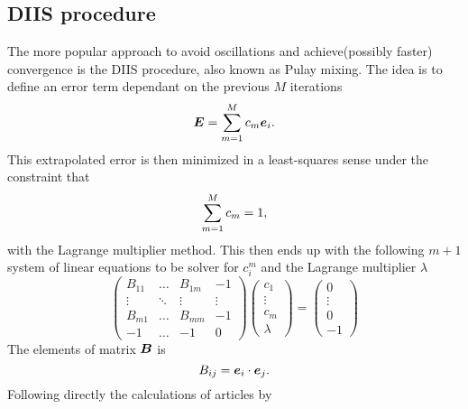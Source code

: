 \subsection{DIIS procedure}
    The more popular approach to avoid oscillations and achieve(possibly
    faster) convergence is the DIIS procedure, also known as Pulay
    mixing\cite{PULAY,PULAY2}. The idea is to define an 
    error term dependant on the previous $M$ iterations
        \begin{equation}
            \blds{E} = \suml{m=1}{M} c_m\blds{e}_i.
        \end{equation}
    This extrapolated error is then minimized in a least-squares sense under
    the constraint that
        \begin{equation}
            \suml{m=1}{M} c_m = 1,
        \end{equation}
    with the Lagrange multiplier method. This then ends up with the following
    $m+1$ system of linear equations to be solver for ${c}^{m}_i$ and the
    Lagrange multiplier $\lambda$
        \begin{equation}
            \begin{pmatrix}
                B_{11} & \dots & B_{1m} & -1 \\
                \vdots & \ddots & \vdots & \vdots \\
                B_{m1} & \dots & B_{mm} & -1 \\
                -1 & \dots & -1 & 0
            \end{pmatrix}
            \begin{pmatrix}
                c_1 \\
                \vdots \\
                c_m \\
                \lambda
            \end{pmatrix}
            =
            \begin{pmatrix}
                0 \\
                \vdots \\
                0 \\
                -1
            \end{pmatrix}
        \end{equation}
    The elements of matrix $\blds{B}$ is
        \begin{equation}
            B_{ij} = \blds{e}_i \cdot \blds{e}_j.
        \end{equation}
    Following directly the calculations of articles \cite{PULAY,PULAY2} by
